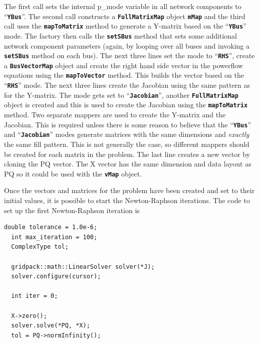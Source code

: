 \documentclass[12pt]{report} %
\begin{document}
The first call sets the internal p\_mode variable in all network components to ``\texttt{\textbf{YBus}}''. The second call constructs a \texttt{\textbf{FullMatrixMap}} object \texttt{\textbf{mMap}} and the third call uses the \texttt{\textbf{mapToMatrix}} method to generate a Y-matrix based on the ``\texttt{\textbf{YBus}}'' mode. The factory then calls the \texttt{\textbf{setSBus}} method that sets some additional network component parameters (again, by looping over all buses and invoking a \texttt{\textbf{setSBus}} method on each bus). The next three lines set the mode to ``\texttt{\textbf{RHS}}'', create a \texttt{\textbf{BusVectorMap}} object and create the right hand side vector in the powerflow equations using the \texttt{\textbf{mapToVector}} method. This builds the vector based on the ``\texttt{\textbf{RHS}}'' mode. The next three lines create the Jacobian using the same pattern as for the Y-matrix. The mode gets set to ``\texttt{\textbf{Jacobian}}'', another \texttt{\textbf{FullMatrixMap}} object is created and this is used to create the Jacobian using the \texttt{\textbf{mapToMatrix}} method. Two separate mappers are used to create the Y-matrix and the Jacobian. This is required unless there is some reason to believe that the ``\texttt{\textbf{YBus}}'' and ``\texttt{\textbf{Jacobian}}'' modes generate matrices with the same dimensions and \textit{exactly} the same fill pattern. This is not generally the case, so different mappers should be created for each matrix in the problem. The last line creates a new vector by cloning the PQ vector. The X vector has the same dimension and data layout as PQ so it could be used with the \texttt{\textbf{vMap}} object.

Once the vectors and matrices for the problem have been created and set to their initial values, it is possible to start the Newton-Raphson iterations. The code to set up the first Newton-Raphson iteration is

{
\color{red}
\begin{Verbatim}[fontseries=b]
  double tolerance = 1.0e-6;
  int max_iteration = 100;
  ComplexType tol;

  gridpack::math::LinearSolver solver(*J);
  solver.configure(cursor);

  int iter = 0;

  X->zero(); 
  solver.solve(*PQ, *X);
  tol = PQ->normInfinity();
\end{Verbatim}
}
\end{document}

